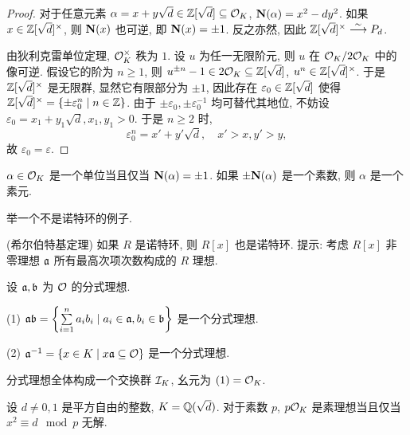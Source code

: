 \begin{proof}
对于任意元素 $\alpha=x+y\sqrt{d}\in {\mathbb{Z}}[\sqrt{d}]\subseteq {\mathcal{O}}_K$, ${\mathbf{N}}(\alpha)=x^2-dy^2$. 如果 $x\in{\mathbb{Z}}[\sqrt{d}]^\times$, 则 ${\mathbf{N}}(x)$ 也可逆, 即 ${\mathbf{N}}(x)=\pm 1$. 反之亦然, 因此 ${\mathbb{Z}}[\sqrt{d}]^\times\stackrel{\sim}{\longrightarrow} P_d$.

由狄利克雷单位定理, ${\mathcal{O}}_K^\times$ 秩为 $1$. 设 $u$ 为任一无限阶元, 则 $u$ 在 ${\mathcal{O}}_K/2{\mathcal{O}}_K$ 中的像可逆. 假设它的阶为 $n\ge 1$, 则 $u^{\pm n}-1\in 2{\mathcal{O}}_K\subseteq {\mathbb{Z}}[\sqrt{d}]$, $u^n\in {\mathbb{Z}}[\sqrt{d}]^\times$. 于是 ${\mathbb{Z}}[\sqrt{d}]^\times$ 是无限群, 显然它有限部分为 $\pm 1$, 因此存在 $\varepsilon_0\in{\mathbb{Z}}[\sqrt{d}]$ 使得 ${\mathbb{Z}}[\sqrt{d}]^\times=\left\{\pm\varepsilon_0^n\mid n\in{\mathbb{Z}}\right\}$. 由于 $\pm \varepsilon_0,\pm \varepsilon_0^{-1}$ 均可替代其地位, 不妨设 $\varepsilon_0=x_1+y_1\sqrt{d},x_1,y_1>0$. 于是 $n\ge 2$ 时,
  \[\varepsilon_0^n=x'+y'\sqrt{d},\quad x'>x,y'>y,\]
故 $\varepsilon_0=\varepsilon$.
\end{proof}

\begin{exercise}
$\alpha\in {\mathcal{O}}_K$ 是一个单位当且仅当 ${\mathbf{N}}(\alpha)=\pm 1$. 如果 $\pm{\mathbf{N}}(\alpha)$ 是一个素数, 则  $\alpha$ 是一个素元.
\end{exercise}
  
\begin{exercise}
举一个不是诺特环的例子.
\end{exercise}


\begin{exercise}
(希尔伯特基定理) 如果 $R$ 是诺特环, 则 $R[x]$ 也是诺特环. 提示: 考虑 $R[x]$ 非零理想 ${\mathfrak{a}}$ 所有最高次项次数构成的 $R$ 理想.
\end{exercise}

\begin{exercise}
设 ${\mathfrak{a}},{\mathfrak{b}}$ 为 ${\mathcal{O}}$ 的分式理想.

(1) ${\mathfrak{a}}{\mathfrak{b}}=\left\{\sum\limits_{i=1}^n a_ib_i\mid a_i\in{\mathfrak{a}},b_i\in{\mathfrak{b}}\right\}$
 是一个分式理想.
 
(2) ${\mathfrak{a}}^{-1}=\left\{x\in K\mid x{\mathfrak{a}}\subseteq{\mathcal{O}}\right\}$ 是一个分式理想.
\end{exercise}

\begin{exercise}
分式理想全体构成一个交换群 ${\mathcal{I}}_K$, 幺元为 $(1)={\mathcal{O}}_K$.
\end{exercise}

\begin{exercise}
设 $d\neq 0,1$ 是平方自由的整数, $K={\mathbb{Q}}(\sqrt{d})$. 对于素数 $p$, $p{\mathcal{O}}_K$ 是素理想当且仅当 $x^2\equiv d\mod p$ 无解.
\end{exercise}

